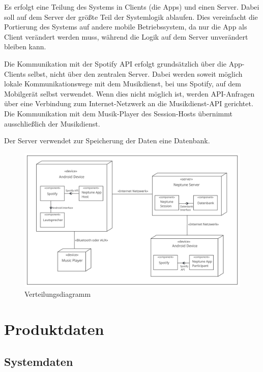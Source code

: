 \documentclass[oneside, ngerman]{sdqtechreport}
\begin{document}
Es erfolgt eine Teilung des Systems in Clients (die Apps) und einen Server. Dabei soll auf dem Server der größte Teil der Systemlogik ablaufen. Dies vereinfacht die Portierung des Systems auf andere mobile Betriebssystem, da nur die App als Client verändert werden muss, während die Logik auf dem Server unverändert bleiben kann.

Die Kommunikation mit der Spotify API erfolgt grundsätzlich über die App-Clients selbst, nicht über den zentralen Server. Dabei werden soweit möglich lokale Kommunikationswege mit dem Musikdienst, bei uns Spotify, auf dem Mobilgerät selbst verwendet. Wenn dies nicht möglich ist, werden API-Anfragen über eine Verbindung zum Internet-Netzwerk an die Musikdienst-API gerichtet. Die Kommunikation mit dem Musik-Player des Session-Hosts übernimmt ausschließlich der Musikdienst.

Der Server verwendet zur Speicherung der Daten eine Datenbank.

\vspace{1cm}

\begin{figure}[h]
    \includegraphics[width = 16cm]{LATEX/Pflichtenheft/GraphicDesigns/Verteilungsdiagramm.png}
    \caption{Verteilungsdiagramm}
    \label{fig:Verteilungsdiagramm}
\end{figure}



\chapter{Produktdaten}
\label{chap:Produktdaten}

\section{Systemdaten}
\label{sec:Produktdaten:Systemdaten}
\end{document}
